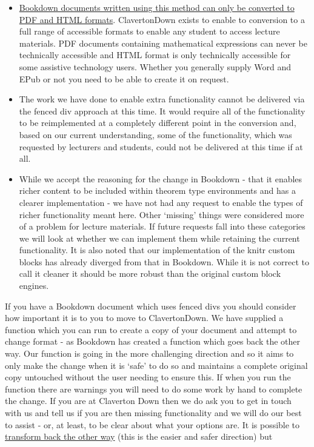 \documentclass[
  10pt,
  a4paper]{article}
\providecommand{\tightlist}{%
  \setlength{\itemsep}{0pt}\setlength{\parskip}{0pt}}
\theoremstyle{plain}
\theoremstyle{definition}
\theoremstyle{plain}
\theoremstyle{plain}
\theoremstyle{plain}
\theoremstyle{plain}
\theoremstyle{definition}
\theoremstyle{definition}
\theoremstyle{remark}
\theoremstyle{remark}
\begin{document}
\begin{itemize}
\tightlist
\item
  \href{https://bookdown.org/yihui/bookdown/markdown-extensions-by-bookdown.html\#theorem-engine}{Bookdown documents written using this method can only be converted to PDF and HTML formats}. ClavertonDown exists to enable to conversion to a full range of accessible formats to enable any student to access lecture materials. PDF documents containing mathematical expressions can never be technically accessible and HTML format is only technically accessible for some assistive technology users. Whether you generally supply Word and EPub or not you need to be able to create it on request.
\item
  The work we have done to enable extra functionality cannot be delivered via the fenced div approach at this time. It would require all of the functionality to be reimplemented at a completely different point in the conversion and, based on our current understanding, some of the functionality, which was requested by lecturers and students, could not be delivered at this time if at all.
\item
  While we accept the reasoning for the change in Bookdown - that it enables richer content to be included within theorem type environments and has a clearer implementation - we have not had any request to enable the types of richer functionality meant here. Other `missing' things were considered more of a problem for lecture materials. If future requests fall into these categories we will look at whether we can implement them while retaining the current functionality. It is also noted that our implementation of the knitr custom blocks has already diverged from that in Bookdown. While it is not correct to call it cleaner it should be more robust than the original custom block engines.
\end{itemize}

If you have a Bookdown document which uses fenced divs you should consider how important it is to you to move to ClavertonDown. We have supplied a function which you can run to create a copy of your document and attempt to change format - as Bookdown has created a function which goes back the other way. Our function is going in the more challenging direction and so it aims to only make the change when it is `safe' to do so and maintains a complete original copy untouched without the user needing to ensure this. If when you run the function there are warnings you will need to do some work by hand to complete the change. If you are at Claverton Down then we do ask you to get in touch with us and tell us if you are then missing functionality and we will do our best to assist - or, at least, to be clear about what your options are. It is possible to \href{https://bookdown.org/yihui/bookdown/markdown-extensions-by-bookdown.html\#theorem-engine}{transform back the other way} (this is the easier and safer direction) but
\end{document}
